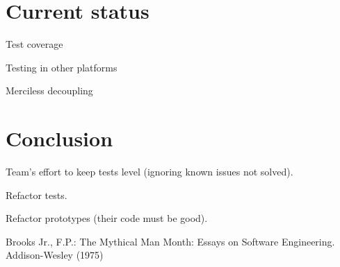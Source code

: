 \documentclass[lnbip]{svmultln}
\begin{document}
\section{Current status}
\label{sec:nowadays}

Test coverage

Testing in other platforms

Merciless decoupling

\section{Conclusion}
\label{sec:conclusion}

Team's effort to keep tests level (ignoring known issues not solved).

Refactor tests.

Refactor prototypes (their code must be good).



%
%
\begin{thebibliography}{5}

 Brooks Jr., F.P.: The Mythical Man Month: Essays
  on Software Engineering. Addison-Wesley (1975)

\end{thebibliography}
%
\end{document}
